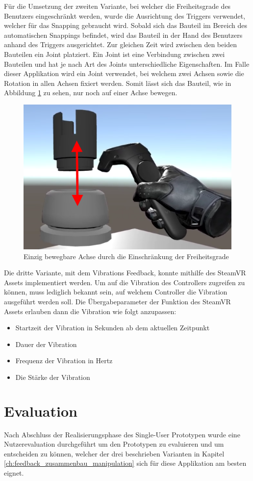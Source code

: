 \bigskip
Für die Umsetzung der zweiten Variante, bei welcher die Freiheitsgrade des Benutzers eingeschränkt werden, wurde die Ausrichtung des Triggers verwendet, welcher für das Snapping gebraucht wird. Sobald sich das Bauteil im Bereich des automatischen Snappings befindet, wird das Bauteil in der Hand des Benutzers anhand des Triggers ausgerichtet. Zur gleichen Zeit wird zwischen den beiden Bauteilen ein Joint platziert. Ein Joint ist eine Verbindung zwischen zwei Bauteilen und hat je nach Art des Joints unterschiedliche Eigenschaften. Im Falle dieser Applikation wird ein Joint verwendet, bei welchem zwei Achsen sowie die Rotation in allen Achsen fixiert werden. Somit lässt sich das Bauteil, wie in Abbildung \ref{fig:einschraenkung_freiheitsgrade} zu sehen, nur noch auf einer Achse bewegen.

\begin{figure}[h!]
	\centering
	\includegraphics[keepaspectratio,width=0.4\linewidth]{img/Einschraenkung_Freiheitsgrade.PNG}
	\caption{Einzig bewegbare Achse durch die Einschränkung der Freiheitsgrade}
	\label{fig:einschraenkung_freiheitsgrade}
\end{figure}

Die dritte Variante, mit dem Vibrations Feedback, konnte mithilfe des SteamVR Assets implementiert werden. Um auf die Vibration des Controllers zugreifen zu können, muss lediglich bekannt sein, auf welchem Controller die Vibration ausgeführt werden soll. Die Übergabeparameter der Funktion des SteamVR Assets erlauben dann die Vibration wie folgt anzupassen:

\begin{itemize} [itemsep=1pt,topsep=0pt]
	\item Startzeit der Vibration in Sekunden ab dem aktuellen Zeitpunkt
	\item Dauer der Vibration
	\item Frequenz der Vibration in Hertz
	\item Die Stärke der Vibration
\end{itemize}

\section{Evaluation}
Nach Abschluss der Realisierungsphase des Single-User Prototypen wurde eine Nutzerevaluation durchgeführt um den Prototypen zu evaluieren und um entscheiden zu können, welcher der drei beschrieben Varianten in Kapitel \ref{ch:feedback_zusammenbau_manipulation} sich für diese Applikation am besten eignet. 

